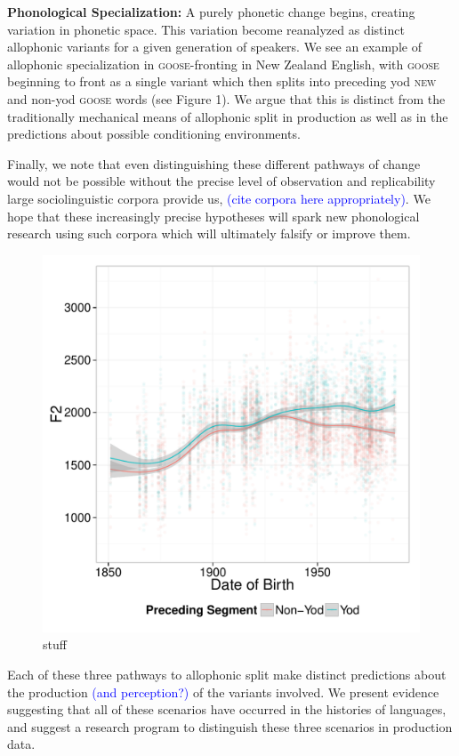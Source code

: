 \documentclass[a4paper,aps,prl,12pt,tightenlines,superscriptaddress]{revtex4}
\begin{document}
\textbf{Phonological Specialization:} %
A purely phonetic change begins, creating variation in phonetic space. This variation become reanalyzed as distinct allophonic variants for a given generation of speakers. We see an example of allophonic specialization in \textsc{goose}-fronting in New Zealand English, with \textsc{goose} beginning to front as a single variant which then splits into preceding yod \textsc{new} and non-yod \textsc{goose} words (see Figure 1). We argue that this is distinct from the traditionally mechanical means of allophonic split in production as well as in the predictions about possible conditioning environments.

Finally, we note that even distinguishing these different pathways of change would not be possible without the precise level of observation and replicability large sociolinguistic corpora provide us, \textcolor{blue}{(cite corpora here appropriately)}. We hope that these increasingly precise hypotheses will spark new phonological research using such corpora which will ultimately falsify or improve them.

\begin{figure}
\begin{center}
\includegraphics[width=.5\textwidth]{ByTokenOldPreceding.pdf}
\end{center}
\caption{stuff}
\label{newzeaFig}
\end{figure}


Each of these three pathways to allophonic split make distinct predictions about the production \textcolor{blue}{(and perception?)} of the variants involved. We present evidence suggesting that all of these scenarios have occurred in the histories of languages, and suggest a research program to distinguish these three scenarios in production data. 


 

\end{document}
